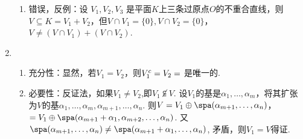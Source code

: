 \begin{enumerate}
\begin{enumerate}
              \item 错误，反例：设 $V_1,V_2,V_3$ 是平面$K$上三条过原点$O$的不重合直线，则$V\subseteq K=V_1+V_2$，但$V\cap V_1=\{0\},V\cap V_2=\{0\}$，$V\ne (V\cap V_1)+(V\cap V_2)$.
          \end{enumerate}

    \item \begin{enumerate}
              \item 充分性：显然，若$V_1=V_2$，则$V_1^c=V_2=\empty$ 是唯一的.

              \item 必要性：反证法，如果$V_1\ne V_2$,即$V_1\not\subseteqq V$. 设$V_1$的基是$\alpha_1,\ldots ,\alpha_m$，将其扩张为$V$的基$\alpha_1,\ldots  ,\alpha_m,\alpha_{m+1},\ldots ,\alpha_n$. 则$V=V_1\oplus \spa(\alpha_{m+1},\ldots ,\alpha_n)$，$=V_1\oplus \spa(\alpha_{m+1}+\alpha_ 1,\alpha_{m+2},\ldots ,\alpha_n)$. 又$\spa(\alpha_{m+1},\ldots ,\alpha_n)\ne \spa(\alpha_{m+1}+\alpha_1,\ldots,\alpha_n)$, 矛盾，则$V_1=V$得证.
          \end{enumerate}
\end{enumerate}

